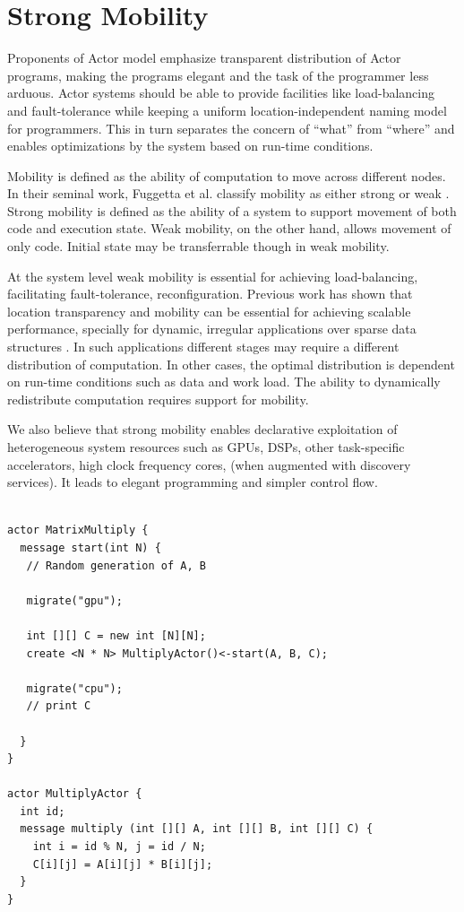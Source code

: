 \section{Strong Mobility}

Proponents of Actor model emphasize transparent distribution of Actor programs, making the programs elegant and the task of the programmer less arduous. Actor systems should be able to provide facilities like load-balancing and fault-tolerance while keeping a uniform location-independent naming model for programmers. This in turn separates the concern of ``what'' from ``where'' and enables optimizations by the system based on run-time conditions.

Mobility is defined as the ability of computation to move across different nodes. In their seminal work, Fuggetta et al. classify mobility as either strong or weak \cite{mobility}. Strong mobility is defined as the ability of a system to support movement of both code and execution state. Weak mobility, on the other hand, allows movement of only code. Initial state may be transferrable though in weak mobility.

At the system level weak mobility is essential for achieving load-balancing, facilitating fault-tolerance, reconfiguration. Previous work has shown that location transparency and mobility can be essential for achieving scalable performance, specially for dynamic, irregular applications over sparse data structures \cite{jpdc94}. In such applications different stages may require a different distribution of computation. In other cases, the optimal distribution is dependent on run-time conditions such as data and work load. The ability to dynamically redistribute computation requires support for mobility.

We also believe that strong mobility enables declarative exploitation of heterogeneous system resources such as GPUs, DSPs, other task-specific accelerators, high clock frequency cores, (when augmented with discovery services). It leads to elegant programming and simpler control flow.

\makebox[\textwidth]{\hrulefill}
\begin{footnotesize}
\begin{verbatim}

actor MatrixMultiply {
  message start(int N) {
   // Random generation of A, B
   
   migrate("gpu");

   int [][] C = new int [N][N];
   create <N * N> MultiplyActor()<-start(A, B, C);

   migrate("cpu");
   // print C

  }
}

actor MultiplyActor {
  int id;
  message multiply (int [][] A, int [][] B, int [][] C) {
    int i = id % N, j = id / N;
    C[i][j] = A[i][j] * B[i][j];
  }
}

\end{verbatim}
\end{footnotesize}
\makebox[\textwidth]{\hrulefill}


